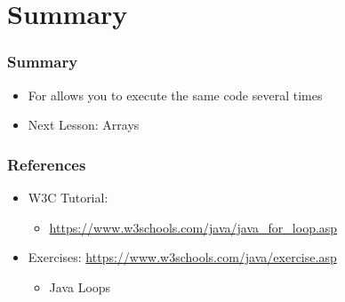 \documentclass{beamer}
\begin{document}
	\section{Summary}
	
	\begin{frame}
		\frametitle{Summary}
		\begin{itemize}
			\item For allows you to execute the same code several times
			\item Next Lesson: Arrays
		\end{itemize}
	\end{frame}

	\begin{frame}
		\frametitle{References}
		\begin{itemize}
			\item W3C Tutorial: 
			\begin{itemize}
				\item \url{https://www.w3schools.com/java/java_for_loop.asp}
			\end{itemize}
			\item Exercises: \url{https://www.w3schools.com/java/exercise.asp}
			\begin{itemize}
				\item Java Loops
			\end{itemize}
		\end{itemize}
		
	\end{frame}
\end{document}
